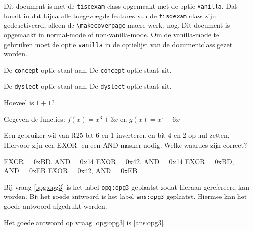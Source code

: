 \documentclass[dutch,a4paper,12pt,addpoints,fleqn,concept,dyslect,vanilla]{tisdexam}
\begin{document}
\makecoverpage

\ifvanilla
Dit document is met de \verb|tisdexam| class opgemaakt met de optie
\verb|vanilla|. Dat houdt in dat bijna alle toegevoegde features van
de \verb|tisdexam| class zijn gedeactiveerd, alleen de
\verb|\makecoverpage| macro werkt nog.
\else
Dit document is opgemaakt in normal-mode of non-vanilla-mode. Om de
vanilla-mode te gebruiken moet de optie \verb|vanilla| in de optielijst
van de documentclass gezet worden.
\fi

\ifconcept
De \verb|concept|-optie staat aan.
\else
De \verb|concept|-optie staat uit.
\fi

\ifdyslect
De \verb|dyslect|-optie staat aan.
\else
De \verb|dyslect|-optie staat uit.
\fi

\bigskip
\bigskip

\begin{questions}
        
\question[10]
Hoeveel is $1+1$?

\question
Gegeven de functies: $f(x) = x^3+3x$ en $g(x) = x^2 +6x$

\question[5]
\label{opg:opg3}
Een gebruiker wil van R25 bit 6 en 1 inverteren en bit 4 en 2 op nul zetten.
Hiervoor zijn een EXOR- en een AND-masker nodig. Welke waardes zijn correct?
\begin{choices}
	\choice EXOR = 0xBD, AND = 0x14
	\choice EXOR = 0x42, AND = 0x14
	\choice EXOR = 0xBD, AND = 0xEB
	\CorrectChoice \label{ans:opg3} EXOR = 0x42, AND = 0xEB
\end{choices}

Bij vraag \ref{opg:opg3} is het label \verb|opg:opg3| geplaatst zodat hieraan
gerefereerd kan worden. Bij het goede antwoord is het label \verb|ans:opg3|
geplaatst. Hiermee kan het goede antwoord afgedrukt worden.

Het goede antwoord op vraag \ref{opg:opg3} is \ref{ans:opg3}.

\end{questions}
\end{document}
